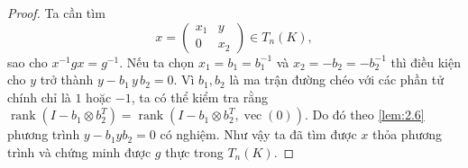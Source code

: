 \begin{proof}
Ta cần tìm 
\[
x=\begin{pmatrix} x_1 & y \\[4pt] 0 & x_2 \end{pmatrix}\in T_n(K),
\]
sao cho \(x^{-1} g x = g^{-1}\). Nếu ta chọn \(x_1=b_1=b_1^{-1}\) và \(x_2=-b_2=-b_2^{-1}\) thì điều kiện cho \(y\) trở thành
\(y - b_1\,y\,b_2 = 0\). Vì \(b_1,b_2\) là ma trận đường chéo
với các phần tử chính chỉ là \(1\) hoặc \(-1\), ta có thể kiểm tra rằng
\(\operatorname{rank}(I - b_1\otimes b_2^{T})=\operatorname{rank}(I - b_1\otimes b_2^{T},\operatorname{vec}(0))\).
Do đó theo \cref{lem:2.6} phương trình \(y - b_1 y b_2 = 0\) có nghiệm. Như vậy ta đã tìm được $x$ thỏa phương trình và chứng minh được $g$ thực trong $T_n(K)$.
\end{proof}
